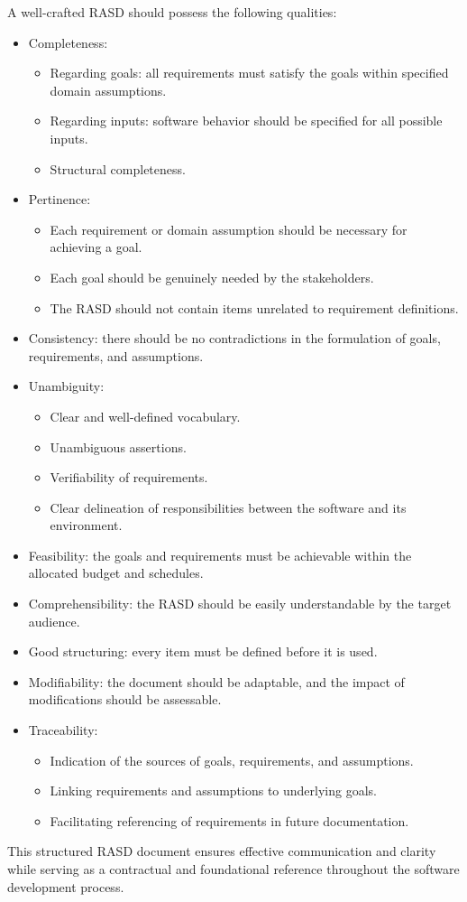 A well-crafted RASD should possess the following qualities:
\begin{itemize}
    \item Completeness:
        \begin{itemize}
            \item Regarding goals: all requirements must satisfy the goals within specified domain assumptions.
            \item Regarding inputs: software behavior should be specified for all possible inputs.
            \item Structural completeness. 
        \end{itemize}
    \item Pertinence: 
        \begin{itemize}
            \item Each requirement or domain assumption should be necessary for achieving a goal.
            \item Each goal should be genuinely needed by the stakeholders.
            \item The RASD should not contain items unrelated to requirement definitions.
        \end{itemize}
    \item Consistency: there should be no contradictions in the formulation of goals, requirements, and assumptions.
    \item Unambiguity: 
        \begin{itemize}
            \item Clear and well-defined vocabulary.
            \item Unambiguous assertions. 
            \item Verifiability of requirements.
            \item Clear delineation of responsibilities between the software and its environment.
        \end{itemize}
    \item Feasibility: the goals and requirements must be achievable within the allocated budget and schedules.
    \item Comprehensibility: the RASD should be easily understandable by the target audience.
    \item Good structuring: every item must be defined before it is used.
    \item Modifiability: the document should be adaptable, and the impact of modifications should be assessable.
    \item Traceability: 
        \begin{itemize}
            \item Indication of the sources of goals, requirements, and assumptions.
            \item Linking requirements and assumptions to underlying goals.
            \item Facilitating referencing of requirements in future documentation.
        \end{itemize}
\end{itemize}   
This structured RASD document ensures effective communication and clarity while serving as a contractual and foundational reference throughout the software development process.
